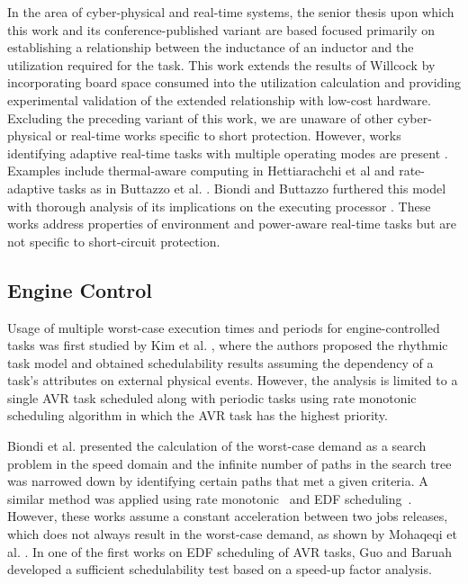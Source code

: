 In the area of cyber-physical and real-time systems, the senior thesis \cite{willcock_short_2016} upon which this work and its conference-published variant \cite{willcock_trading_2017-1} are based focused primarily on establishing a relationship between the inductance of an inductor and the utilization required for the task.
This work extends the results of Willcock \cite{willcock_short_2016} by incorporating board space consumed into the utilization calculation and providing experimental validation of the extended relationship with low-cost hardware. Excluding the preceding variant of this work, we are unaware of other cyber-physical or real-time works specific to short protection. However, works identifying adaptive real-time tasks with multiple operating modes are present \cite{huang_techniques_2015}. Examples include thermal-aware computing in Hettiarachchi et al \cite{hettiarachchi_design_2014} and rate-adaptive tasks as in Buttazzo et al. \cite{buttazzo_rate-adaptive_2014}. Biondi and Buttazzo furthered this model with thorough analysis of its implications on the executing processor \cite{biondi_engine_2015}.
These works address properties of environment and power-aware real-time tasks but are not specific to short-circuit protection.

\subsection{Engine Control} \label{subsec:engCtrl-relatedWork}

Usage of multiple worst-case execution times and periods for engine-controlled tasks was first studied by Kim et al. \cite{kim_rhythmic_2012}, where the authors proposed the rhythmic task model and obtained schedulability results assuming the dependency of a task's attributes on external physical events.
However, the analysis is limited to a single AVR task scheduled along with periodic tasks using rate monotonic scheduling algorithm in which the AVR task has the highest priority.

Biondi et al. \cite{biondi_exact_2014} presented the calculation of the worst-case demand as a search problem in the speed domain and the infinite number of paths in the search tree was narrowed down by identifying certain paths that met a given criteria.
A similar method was applied using rate monotonic~\cite{biondi_response-time_2015} and EDF scheduling~\cite{biondi_feasibility_2015}.
However, these works assume a constant acceleration between two jobs releases, which does not always result in the worst-case demand, as shown by Mohaqeqi et al. \cite{mohaqeqi_refinement_2017}.
In one of the first works on EDF scheduling of AVR tasks, Guo and Baruah~\cite{guo_uniprocessor_2015} developed a sufficient schedulability test based on a speed-up factor analysis. %

